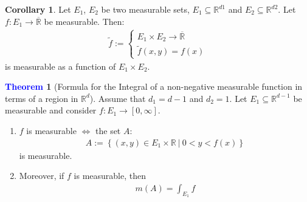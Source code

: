 \documentclass[reqno,11pt]{amsart}
\theoremstyle{definition}
\newcommand{\rd}[0]{\mathbb{R}^d}
\newcommand{\bb}[1]{\mathbb{#1}}
\newcommand{\sets}[2]{ \left\{ #1\ |\ #2 \right\}}
\newtheorem{theorem}{\textcolor{blue}{Theorem}}
\newtheorem{corollary}{Corollary}
\theoremstyle{definition}
\theoremstyle{remark}
\begin{document}
\begin{corollary}
	Let $E_1$, $E_2$ be two measurable sets, $E_1 \subseteq \bb{R}^{d1}$ and $E_2 \subseteq \bb{R}^{d2}$. Let $f: E_1 \rightarrow \overline{\bb{R}}$ be measurable. Then: 
	\begin{align*}
		\widetilde{f} := 
		\begin{cases}
			 E_1 \times E_2 \rightarrow \overline{\bb{R}} \\
			 \widetilde{f}(x,y) = f(x) 
		\end{cases}
	\end{align*}
	is measurable as a function of $E_1 \times E_2$. 
\end{corollary}

\begin{theorem}[Formula for the Integral of a non-negative measurable function in terms of a region in $\rd$] 
	Assume that $d_1 = d - 1$ and $d_2 = 1$. Let $E_1 \subseteq \bb{R}^{d-1}$ be measurable and consider $f: E_1 \rightarrow [0, \infty]$. 
	\begin{enumerate}[noitemsep]
		\item $f$ is measurable $\iff$ the set $A$: 
	\begin{align*}
		A := \sets{(x,y) \in E_1 \times \bb{R}}{0 < y < f(x)}	
	\end{align*}
	is measurable. 
	\item Moreover, if $f$ is measurable, then 
	\begin{align}
		m(A) = \int_{E_1} f 
	\end{align}
	\end{enumerate}	
\end{theorem}
\end{document}
